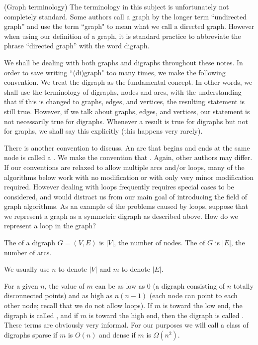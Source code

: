 \begin{note}(Graph terminology)
The terminology in this subject is unfortunately not completely
standard. Some authors call a graph by the longer term ``undirected
graph'' and use the term ``graph" to mean what we call a directed graph.
However when using our definition of a graph,  it is standard practice
to abbreviate the phrase ``directed graph'' with the word digraph.


We shall be dealing with both graphs and digraphs throughout these
notes. In order to save writing ``(di)graph" too many times, we make the
following convention.  We treat the digraph as the fundamental concept.
In other words, we shall use the terminology of digraphs, nodes and
arcs, with the understanding that if this is changed to graphs, edges,
and vertices, the resulting statement is still true. However, if we talk
about graphs, edges, and vertices, our statement is not necessarily true
for digraphs. Whenever a result is true for digraphs but not for graphs,
we shall say this explicitly (this happens very rarely).  

There is another convention to discuss. An arc that begins and ends at the
same node is called a . We make the convention that
. Again, other authors
may differ. If our conventions are relaxed to allow multiple arcs and/or
loops, many of the algorithms below work with no modification or with only
very minor modification required. However dealing with loops frequently
requires special cases to be considered, and  would distract us from our
main goal of introducing the field of graph algorithms. As an example
of the problems caused by loops, suppose that we represent a graph as
a symmetric digraph as described above. How do we represent a loop in
 the graph?
\end{note}


\begin{Definition} 
The  of a digraph $G=(V,E)$ is $|V|$, the number of nodes. 
The  of $G$ is $|E|$, the number of arcs.

\end{Definition}
 
We usually use $n$ to denote $|V|$ and $m$ to denote
$|E|$.

For a given $n$, the value of $m$ can be as low as $0$ (a digraph
consisting of $n$ totally disconnected points)  and as high as
$n(n-1)$ (each node can point to each other node; recall that we do
not allow loops). If $m$ is toward the low end, the digraph is called
, and if $m$ is toward the high end, then the digraph
is called . These terms are obviously very informal. For
our purposes we will call a class of digraphs sparse if $m$ is $O(n)$
and dense if $m$ is $\Omega(n^2)$.

